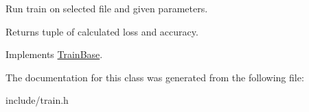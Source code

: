 Run train on selected file and given parameters. \begin{DoxyReturn}{Returns}
tuple of calculated loss and accuracy. 
\end{DoxyReturn}


Implements \hyperlink{class_train_base}{Train\+Base}.



The documentation for this class was generated from the following file\+:\begin{DoxyCompactItemize}
\item 
include/train.\+h\end{DoxyCompactItemize}
